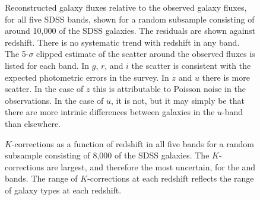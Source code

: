 \clearpage
{}
\begin{figure}
\figurenum{\fignum}
\caption{\label{k_model_plot} Reconstructed galaxy fluxes relative to
the observed galaxy fluxes, for all five SDSS bands, shown for a
random subsample consisting of around 10,000 of the SDSS galaxies. The
residuals are shown against redshift.  There is no systematic trend
with redshift in any band. The 5-$\sigma$ clipped estimate of the
scatter around the observed fluxes is listed for each band. In $g$,
$r$, and $i$ the scatter is consistent with the expected photometric
errors in the survey. In $z$ and $u$ there is more scatter. In the
case of $z$ this is attributable to Poisson noise in the
observations. In the case of $u$, it is not, but it may simply be that
there are more intrinic differences between galaxies in the $u$-band
than elsewhere.}
\end{figure}

\clearpage
{}
\begin{figure}
\figurenum{\fignum}
\caption{\label{main_colors_plot} }
\end{figure}

\clearpage
{}
\begin{figure}
\figurenum{\fignum}
\caption{\label{lrg_colors_plot} }
\end{figure}

\clearpage
{}
\begin{figure}
\figurenum{\fignum}
\caption{\label{spur} }
\end{figure}

\clearpage
{}
\begin{figure}
\figurenum{\fignum}
\caption{\label{kcorrect.sample8b15} $K$-corrections as a function of
redshift in all five bands for a random subsample consisting of 8,000
of the SDSS galaxies. The $K$-corrections are largest, and therefore
the most uncertain, for the  and  bands. The
range of $K$-corrections at each redshift reflects the range of galaxy
types at each redshift.}
\end{figure}

\clearpage
{}
\begin{figure}
\figurenum{\fignum}
\caption{\label{k_speck_plot.0.1} }
\end{figure}

